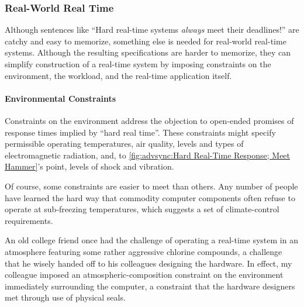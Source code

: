 \subsubsection{Real-World Real Time}
\label{sec:advsync:Real-World Real Time}

Although sentences like ``Hard real-time systems \emph{always} meet
their deadlines!\@'' are catchy and easy to memorize, something else is
needed for real-world real-time systems.
Although the resulting specifications are
harder to memorize, they can simplify construction of a real-time
system by imposing constraints on the environment, the workload, and
the real-time application itself.

\paragraph{Environmental Constraints}
\label{sec:advsync:Environmental Constraints}

Constraints on the environment address the objection to open-ended
promises of response times implied by ``hard real time''.
These constraints might specify permissible operating temperatures,
air quality, levels and types of electromagnetic radiation, and, to
\cref{fig:advsync:Hard Real-Time Response; Meet Hammer}'s
point, levels of shock and vibration.

Of course, some constraints are easier to meet than others.
Any number of people have learned the hard way that
commodity computer components often refuse to operate at sub-freezing
temperatures, which suggests a set of climate-control requirements.

An old college friend once had the challenge of operating
a real-time system in an atmosphere featuring some rather aggressive
chlorine compounds, a challenge that he wisely handed off to his
colleagues designing the hardware.
In effect, my colleague imposed an atmospheric-composition constraint
on the environment immediately surrounding the computer, a constraint
that the hardware designers met through use of physical seals.

